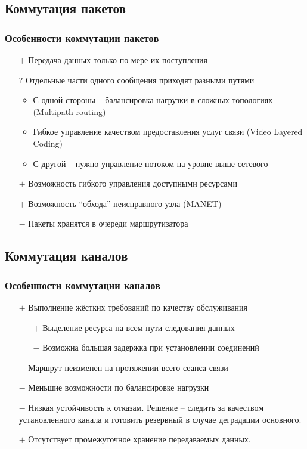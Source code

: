 \documentclass[utf8]{beamer}
\begin{document}
\subsection{Коммутация пакетов}
\begin{frame}
\frametitle{Особенности коммутации пакетов}
\begin{itemize}
	\item[$+$] Передача данных только по мере их поступления
	\item[?] Отдельные части одного сообщения приходят разными путями
	\begin{itemize}
		\item С одной стороны -- балансировка нагрузки в сложных топологиях (Multipath routing)
		\item Гибкое управление качеством предоставления услуг связи (Video Layered Coding)
		\item С другой -- нужно управление потоком на уровне выше сетевого
	\end{itemize}
	\item[$+$] Возможность гибкого управления доступными ресурсами
	\item[$+$] Возможность ``обхода'' неисправного узла (MANET)
	\item[$-$] Пакеты хранятся в очереди маршрутизатора
\end{itemize}
\end{frame}
\subsection{Коммутация каналов}
\begin{frame}
\frametitle{Особенности коммутации каналов}
\begin{itemize}
	\item[$+$] Выполнение жёстких требований по качеству обслуживания
	\begin{itemize}
		\item[$+$] Выделение ресурса на всем пути следования данных
		\item[$-$] Возможна большая задержка при установлении соединений
	\end{itemize}
	\item [$-$] Маршрут неизменен на протяжении всего сеанса связи
	\item [$-$] Меньшие возможности по балансировке нагрузки
	\item[$-$] Низкая устойчивость к отказам. Решение -- следить за качеством установленного канала и готовить резервный в случае деградации основного.
	\item[$+$] Отсутствует промежуточное хранение передаваемых данных.
\end{itemize}
\end{frame}
\end{document}

